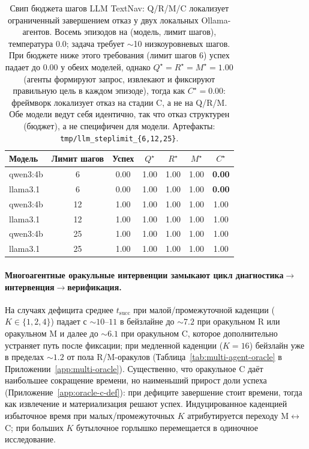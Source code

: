 \documentclass{article}
\begin{document}
\begin{table}[h]
  \caption{Свип бюджета шагов LLM TextNav: Q/R/M/C локализует ограниченный завершением отказ у двух локальных Ollama-агентов. Восемь эпизодов на (модель, лимит шагов), температура 0.0; задача требует $\sim$10 низкоуровневых шагов. При бюджете ниже этого требования (лимит шагов 6) успех падает до $0.00$ у обеих моделей, однако $Q^\star{=}R^\star{=}M^\star{=}1.00$ (агенты формируют запрос, извлекают и фиксируют правильную цель в каждом эпизоде), тогда как $C^\star{=}0.00$: фреймворк локализует отказ на стадии C, а не на Q/R/M. Обе модели ведут себя идентично, так что отказ структурен (бюджет), а не специфичен для модели. Артефакты: \texttt{tmp/llm\_steplimit\_\{6,12,25\}}.}
  \label{tab:llm-smoke}
  \centering
  \small
  \begin{tabular}{l c c c c c c}
    \toprule
    Модель & Лимит шагов & Успех & $Q^\star$ & $R^\star$ & $M^\star$ & $C^\star$ \\
    \midrule
    qwen3:4b & 6  & 0.00 & 1.00 & 1.00 & 1.00 & \textbf{0.00} \\
    llama3.1 & 6  & 0.00 & 1.00 & 1.00 & 1.00 & \textbf{0.00} \\
    \midrule
    qwen3:4b & 12 & 1.00 & 1.00 & 1.00 & 1.00 & 1.00 \\
    llama3.1 & 12 & 1.00 & 1.00 & 1.00 & 1.00 & 1.00 \\
    qwen3:4b & 25 & 1.00 & 1.00 & 1.00 & 1.00 & 1.00 \\
    llama3.1 & 25 & 1.00 & 1.00 & 1.00 & 1.00 & 1.00 \\
    \bottomrule
  \end{tabular}
\end{table}

\paragraph{Многоагентные оракульные интервенции замыкают цикл диагностика$\to$интервенция$\to$верификация.}
На случаях дефицита среднее $t_{\mathrm{succ}}$ при малой/промежуточной каденции ($K{\in}\{1,2,4\}$) падает с $\sim10$--$11$ в бейзлайне до $\sim7.2$ при оракульном R или оракульном M и далее до $\sim6.1$ при оракульном C, которое дополнительно устраняет путь после фиксации; при медленной каденции ($K{=}16$) бейзлайн уже в пределах $\sim1.2$ от пола R/M-оракулов (Таблица~\ref{tab:multi-agent-oracle} в Приложении~\ref{app:multi-oracle}). Существенно, что оракульное C даёт наибольшее сокращение времени, но наименьший прирост доли успеха (Приложение~\ref{app:oracle-c-def}): при дефиците завершение стоит времени, тогда как извлечение и материализация решают успех. Индуцированное каденцией избыточное время при малых/промежуточных $K$ атрибутируется переходу M$\leftrightarrow$C; при больших $K$ бутылочное горлышко перемещается в одиночное исследование.
\end{document}
